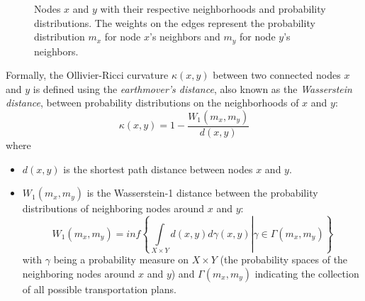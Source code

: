 \documentclass[12pt,a4paper]{article}
\begin{document}
\begin{figure}[ht] \label{fig1}
    \centering
    \caption{Nodes $x$ and $y$ with their respective neighborhoods and probability distributions. The weights on the edges represent the probability distribution $m_x$ for node $x$'s neighbors and $m_y$ for node $y$'s neighbors.}
\end{figure}



Formally, the Ollivier-Ricci curvature $\kappa(x, y)$ between two connected nodes $x$ and $y$ is defined using the \textit{earthmover's distance}, also known as the \textit{Wasserstein distance}, between probability distributions on the neighborhoods of $x$ and $y$:
\begin{equation}\label{eq3}
    \kappa(x, y) = 1 - \frac{W_1(m_x, m_y)}{d(x, y)}
\end{equation}
where
\begin{itemize}
    \item $d(x, y)$ is the shortest path distance between nodes $x$ and $y$.
    \item $W_1(m_x, m_y)$ is the Wasserstein-1 distance between the probability distributions of neighboring nodes around $x$ and $y$:
    \begin{equation}
        W_1(m_x, m_y) = \textit{inf} \left\{ \left. \int\limits_{X \times Y} d(x,y) d\gamma(x,y) \right| \gamma \in \Gamma(m_x, m_y)  \right\}
    \end{equation}
    with $\gamma$ being a probability measure on $X \times Y$ (the probability spaces of the neighboring nodes around $x$ and $y$) and $\Gamma(m_x, m_y)$ indicating the collection of all possible transportation plans.
\end{itemize}
\end{document}
